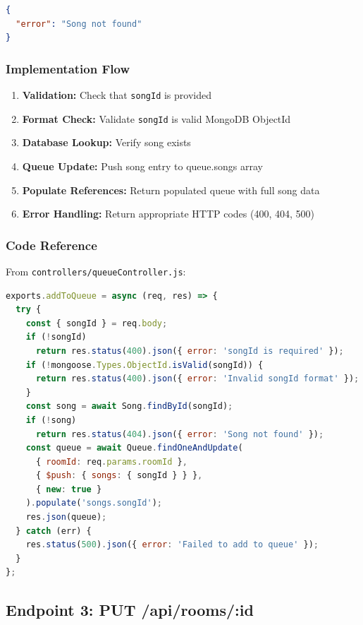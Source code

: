 \documentclass[11pt,a4paper]{article}
\begin{document}
\begin{lstlisting}[language=json, caption=404 Not Found - Song doesn't exist]
{
  "error": "Song not found"
}
\end{lstlisting}

\subsubsection{Implementation Flow}

\begin{enumerate}
    \item \textbf{Validation:} Check that \texttt{songId} is provided
    \item \textbf{Format Check:} Validate \texttt{songId} is valid MongoDB ObjectId
    \item \textbf{Database Lookup:} Verify song exists
    \item \textbf{Queue Update:} Push song entry to queue.songs array
    \item \textbf{Populate References:} Return populated queue with full song data
    \item \textbf{Error Handling:} Return appropriate HTTP codes (400, 404, 500)
\end{enumerate}

\subsubsection{Code Reference}

From \texttt{controllers/queueController.js}:
\begin{lstlisting}[language=javascript]
exports.addToQueue = async (req, res) => {
  try {
    const { songId } = req.body;
    if (!songId) 
      return res.status(400).json({ error: 'songId is required' });
    if (!mongoose.Types.ObjectId.isValid(songId)) {
      return res.status(400).json({ error: 'Invalid songId format' });
    }
    const song = await Song.findById(songId);
    if (!song) 
      return res.status(404).json({ error: 'Song not found' });
    const queue = await Queue.findOneAndUpdate(
      { roomId: req.params.roomId },
      { $push: { songs: { songId } } },
      { new: true }
    ).populate('songs.songId');
    res.json(queue);
  } catch (err) {
    res.status(500).json({ error: 'Failed to add to queue' });
  }
};
\end{lstlisting}

\subsection{Endpoint 3: PUT /api/rooms/:id}
\end{document}
